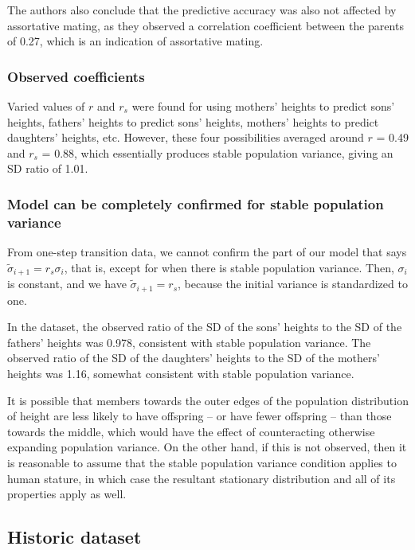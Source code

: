 \documentclass[letterpaper,10pt]{article} %
\begin{document}
The authors also conclude that the predictive accuracy was also not affected by assortative mating, as they observed a correlation coefficient between the parents of 0.27, which is an indication of assortative mating.



\subsubsection*{Observed coefficients}
Varied values of $r$ and $r_s$ were found for using mothers' heights to predict sons' heights, fathers' heights to predict sons' heights, mothers' heights to predict daughters' heights, etc. However, these four possibilities averaged around $r$ = 0.49 and $r_s$ = 0.88, which essentially produces stable population variance, giving an SD ratio of 1.01.


\subsubsection*{Model can be completely confirmed for stable population variance}
From one-step transition data, we cannot confirm the part of our model that says $\tilde{\sigma}_{i+1} = r_s \sigma_i$, that is, except for when there is stable population variance. Then, $\sigma_i$ is constant, and we have $\tilde{\sigma}_{i+1} = r_s$, because the initial variance is standardized to one.

In the dataset, the observed ratio of the SD of the sons' heights to the SD of the fathers' heights was 0.978, consistent with stable population variance. The observed ratio of the SD of the daughters' heights to the SD of the mothers' heights was 1.16, somewhat consistent with stable population variance. 

It is possible that members towards the outer edges of the population distribution of height are less likely to have offspring -- or have fewer offspring -- than those towards the middle, which would have the effect of counteracting otherwise expanding population variance. On the other hand, if this is not observed, then it is reasonable to assume that the stable population variance condition applies to human stature, in which case the resultant stationary distribution and all of its properties apply as well. 



\subsection{Historic dataset}
\end{document}
